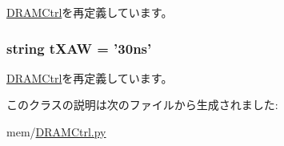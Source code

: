 \hyperlink{classDRAMCtrl_1_1DRAMCtrl_aab12a5441587fc9009b2cd7b83865f92}{DRAMCtrl}を再定義しています。\hypertarget{classDRAMCtrl_1_1DDR3__1333__x64__DRAMSim2_a94c112e585153e09e803751da3cfafcd}{
\subsubsection[{tXAW}]{\setlength{\rightskip}{0pt plus 5cm}string {\bf tXAW} = '30ns'}}
\label{classDRAMCtrl_1_1DDR3__1333__x64__DRAMSim2_a94c112e585153e09e803751da3cfafcd}


\hyperlink{classDRAMCtrl_1_1DRAMCtrl_a7de8ac1f9497dea29b2aaab67a0fb1cc}{DRAMCtrl}を再定義しています。

このクラスの説明は次のファイルから生成されました:\begin{DoxyCompactItemize}
\item 
mem/\hyperlink{DRAMCtrl_8py}{DRAMCtrl.py}\end{DoxyCompactItemize}
